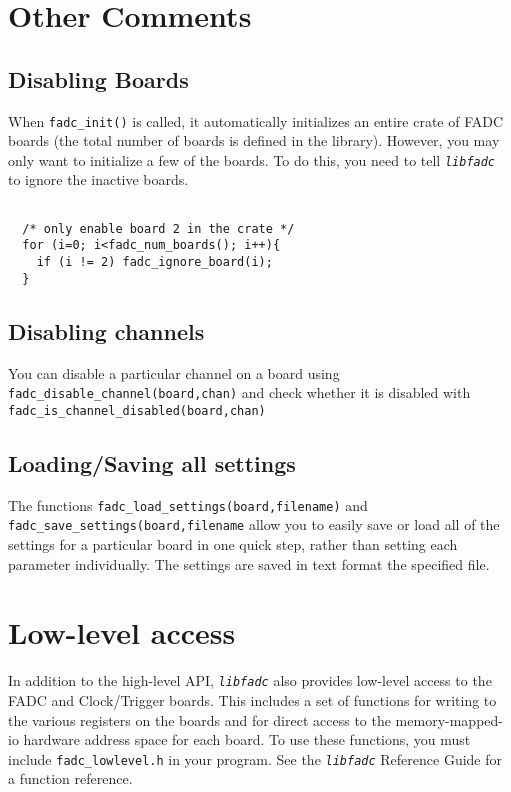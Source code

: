 \documentclass{article}
\newcommand{\libfadc}{\emph{\texttt{libfadc}} }
\newcommand{\F}[1]{\texttt{#1}}
\begin{document}
\section{Other Comments} 

\subsection{Disabling Boards}

When \F{fadc\_init()} is called, it automatically initializes an
entire crate of FADC boards (the total number of boards is defined in
the library).  However, you may only want to initialize a few of the
boards.  To do this, you need to tell \libfadc to ignore the inactive
boards.

\begin{verbatim}

  /* only enable board 2 in the crate */
  for (i=0; i<fadc_num_boards(); i++){
    if (i != 2) fadc_ignore_board(i);
  }
\end{verbatim}

\subsection{Disabling channels}

You can disable a particular channel on a board using
\F{fadc\_disable\_channel(board,chan)} and check whether it is
disabled with \F{fadc\_is\_channel\_disabled(board,chan)}

\subsection{Loading/Saving all settings}

The functions \F{fadc\_load\_settings(board,filename)} and
\F{fadc\_save\_settings(board,filename} allow you to easily save or
load all of the settings for a particular board in one quick step,
rather than setting each parameter individually.  The settings are
saved in text format the specified file.


\section{Low-level access}

In addition to the high-level API, \libfadc also provides low-level
access to the FADC and Clock/Trigger boards.  This includes a set of
functions for writing to the various registers on the boards and for
direct access to the memory-mapped-io hardware address space for each
board.  To use these functions, you must include \F{fadc\_lowlevel.h}
in your program.  See the \libfadc Reference Guide for a function
reference.
\end{document}
